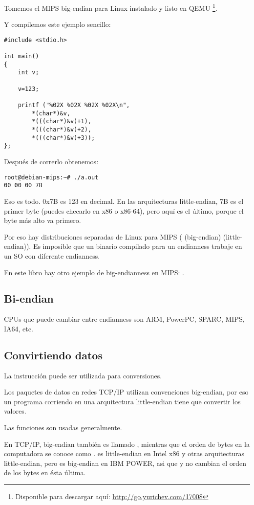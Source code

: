 Tomemos el MIPS big-endian para Linux instalado y listo en QEMU
\footnote{Disponible para descargar aqu\'i: \url{http://go.yurichev.com/17008}}.

Y compilemos este ejemplo sencillo:

\begin{lstlisting}[style=customc]
#include <stdio.h>

int main()
{
	int v;

	v=123;

	printf ("%02X %02X %02X %02X\n", 
		*(char*)&v,
		*(((char*)&v)+1),
		*(((char*)&v)+2),
		*(((char*)&v)+3));
};
\end{lstlisting}

Despu\'es de correrlo obtenemos:

\begin{lstlisting}
root@debian-mips:~# ./a.out 
00 00 00 7B
\end{lstlisting}

Eso es todo.
0x7B es 123 en decimal.
En las arquitecturas little-endian, 7B es el primer byte (puedes checarlo en x86 o x86-64),
pero aqu\'i es el \'ultimo, porque el byte m\'as alto va primero.

Por eso hay distribuciones separadas de Linux para MIPS
( (big-endian) \ESph{}  (little-endian)).
Es imposible que un binario compilado para un endianness trabaje en un SO con diferente endianness.

En este libro hay otro ejemplo de big-endianness en MIPS: .

\subsection{Bi-endian}

CPUs que puede cambiar entre endianness son ARM, PowerPC, SPARC, MIPS, \ac{IA64}, etc.

\subsection{Convirtiendo datos}

La instrucci\'on  puede ser utilizada para conversiones.

Los paquetes de datos en redes TCP/IP utilizan convenciones big-endian, por eso un programa corriendo en una arquitectura
little-endian tiene que convertir los valores.

Las funciones  \ESph{}  son usadas generalmente.

En TCP/IP, big-endian tambi\'en es llamado ,
mientras que el orden de bytes en la computadora se conoce como .
 es little-endian en Intel x86 y otras arquitecturas little-endian,
pero es big-endian en IBM POWER, asi que  y  no cambian el orden de los bytes
en \'esta \'ultima.

